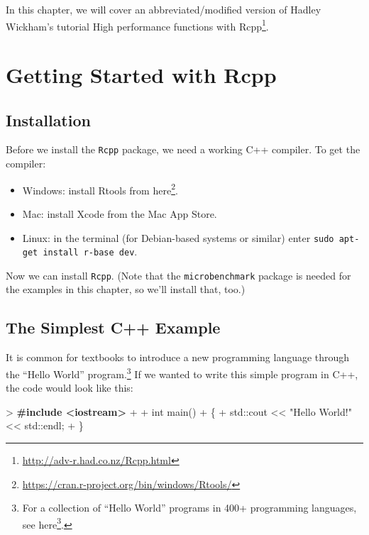 \documentclass[
]{krantz}
\makeatletter
\newenvironment{Shaded}{\begin{snugshade}}{\end{snugshade}}
\newcommand{\BuiltInTok}[1]{#1}
\newcommand{\DataTypeTok}[1]{\textcolor[rgb]{0.27,0.27,0.27}{#1}}
\newcommand{\ErrorTok}[1]{\textcolor[rgb]{0.14,0.14,0.14}{\textbf{#1}}}
\newcommand{\NormalTok}[1]{#1}
\newcommand{\StringTok}[1]{\textcolor[rgb]{0.5,0.5,0.5}{#1}}
\providecommand{\tightlist}{%
  \setlength{\itemsep}{0pt}\setlength{\parskip}{0pt}}
\renewcommand{\href}[2]{#2\footnote{\url{#1}}}
\newenvironment{kframe}{%
\medskip{}
\setlength{\fboxsep}{.8em}
 \def\at@end@of@kframe{}%
 \ifinner\ifhmode%
  \def\at@end@of@kframe{\end{minipage}}%
  \begin{minipage}{\columnwidth}%
 \fi\fi%
 \def\FrameCommand##1{\hskip\@totalleftmargin \hskip-\fboxsep
 \colorbox{shadecolor}{##1}\hskip-\fboxsep
     \hskip-\linewidth \hskip-\@totalleftmargin \hskip\columnwidth}%
 \MakeFramed {\advance\hsize-\width
   \@totalleftmargin\z@ \linewidth\hsize
   \@setminipage}}%
 {\par\unskip\endMakeFramed%
 \at@end@of@kframe}
\renewenvironment{Shaded}{\begin{kframe}}{\end{kframe}}
\makeatother
\begin{document}
In this chapter, we will cover an abbreviated/modified version of Hadley Wickham's tutorial \href{http://adv-r.had.co.nz/Rcpp.html}{High performance functions with Rcpp}.

\hypertarget{getting-started-with-rcpp}{%
\section{Getting Started with Rcpp}\label{getting-started-with-rcpp}}

\hypertarget{installation}{%
\subsection{Installation}\label{installation}}

Before we install the \texttt{Rcpp} package, we need a working C++ compiler. To get the compiler:

\begin{itemize}
\tightlist
\item
  Windows: install Rtools from \href{https://cran.r-project.org/bin/windows/Rtools/}{here}.
\item
  Mac: install Xcode from the Mac App Store.
\item
  Linux: in the terminal (for Debian-based systems or similar) enter
  \texttt{sudo\ apt-get\ install\ r-base\ dev}.
\end{itemize}

Now we can install \texttt{Rcpp}. (Note that the \texttt{microbenchmark} package is needed for the examples in this chapter, so we'll install that, too.)

\hypertarget{the-simplest-c-example}{%
\subsection{The Simplest C++ Example}\label{the-simplest-c-example}}

It is common for textbooks to introduce a new programming language through the ``Hello World'' program.\footnote{For a collection of ``Hello World'' programs in 400+ programming languages, see \href{https://helloworldcollection.github.io/}{here}.} If we wanted to write this simple program in C++, the code would look like this:

\begin{Shaded}
\begin{Highlighting}[]
\NormalTok{\textgreater{} }\ErrorTok{\#include \textless{}iostream\textgreater{}}
\NormalTok{+ }
\NormalTok{+ }\DataTypeTok{int}\NormalTok{ main()}
\NormalTok{+ \{}
\NormalTok{+     }\BuiltInTok{std::}\NormalTok{cout \textless{}\textless{} }\StringTok{"Hello World!"}\NormalTok{ \textless{}\textless{} }\BuiltInTok{std::}\NormalTok{endl;}
\NormalTok{+ \}}
\end{Highlighting}
\end{Shaded}
\end{document}
